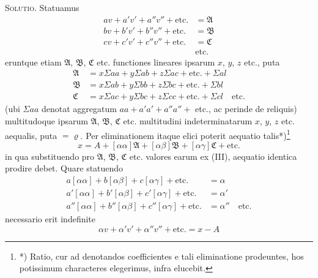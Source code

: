 \documentclass[12pt,a4paper]{book}
\begin{document}
\textsc{Solutio.} Statuamus
%
\begin{equation*}
\begin{aligned}
av+a'v'+a''v''+\text{etc.}&=\mathfrak{A}\\
bv+b'v'+b''v''+\text{etc.}&=\mathfrak{B}\\
cv+c'v'+c''v''+\text{etc.}&=\mathfrak{C}\\
&\text{etc.}
\end{aligned}\tag{II}
\end{equation*}
eruntque etiam $\mathfrak{A}$, $\mathfrak{B}$, $\mathfrak{C}$ etc. functiones lineares ipsarum $x$, $y$, $z$ etc., puta
%
\begin{equation*}
\begin{aligned}
\mathfrak{A} &= x\Sigma aa+y\Sigma ab+z\Sigma ac+\text{etc.}+\Sigma al\\
\mathfrak{B} &= x\Sigma ab+y\Sigma bb+z\Sigma bc+\text{etc.}+\Sigma bl\\
\mathfrak{C} &= x\Sigma ac+y\Sigma bc+z\Sigma cc+\text{etc.}+\Sigma cl\quad\text{etc.}
\end{aligned}\tag{III}
\end{equation*}
(ubi $\Sigma aa$ denotat aggregatum $aa+a'a'+a''a''+$ etc., ac perinde de reliquis) multitudoque ipsarum $\mathfrak{A}$, $\mathfrak{B}$, $\mathfrak{C}$ etc. multitudini indeterminatarum $x$, $y$, $z$ etc. aequalis, puta $=\varrho$. Per eliminationem itaque elici poterit aequatio talis*)\footnote{*) Ratio, cur ad denotandos coefficientes e tali eliminatione prodeuntes, hos potissimum characteres elegerimus, infra elucebit.}
%
\begin{equation*}
x=A+[\alpha\alpha]\mathfrak{A}+[\alpha\beta]\mathfrak{B}+[\alpha\gamma]\mathfrak{C}+\text{etc.}
\end{equation*}
in qua substituendo pro $\mathfrak{A}$, $\mathfrak{B}$, $\mathfrak{C}$ etc. valores earum ex (III), aequatio identica prodire debet. Quare statuendo
%
\begin{equation*}
\begin{aligned}
a[\alpha\alpha]+b[\alpha\beta]+c[\alpha\gamma]+\text{etc.}&=\alpha\\
a'[\alpha\alpha]+b'[\alpha\beta]+c'[\alpha\gamma]+\text{etc.}&=\alpha'\\
a''[\alpha\alpha]+b''[\alpha\beta]+c''[\alpha\gamma]+\text{etc.}&=\alpha''\quad\text{etc.}
\end{aligned}\tag{IV}
\end{equation*}
necessario erit indefinite
%
\begin{equation*}
\alpha v+\alpha'v'+\alpha''v''+\text{etc.}=x-A\tag{V}
\end{equation*}
\end{document}
